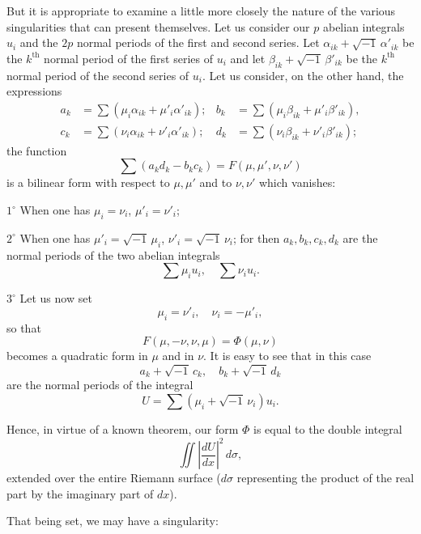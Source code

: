 \documentclass{article}
\begin{document}
But it is appropriate to examine a little more closely the nature of the various singularities that can present themselves. Let us consider our $p$ abelian integrals $u_{i}$ and the $2p$ normal periods of the first and second series. Let $\alpha_{ik} + \sqrt{-1}\,\alpha'_{ik}$ be the $k^{\text{th}}$ normal period of the first series of $u_{i}$ and let $\beta_{ik} + \sqrt{-1}\,\beta'_{ik}$ be the $k^{\text{th}}$ normal period of the
second series of $u_{i}$. Let us consider, on the other hand, the expressions
\[
\begin{aligned}
a_{k} &= \sum (\mu_{i} \alpha_{ik} + \mu'_{i} \alpha'_{ik}); & b_{k} &= \sum (\mu_{i} \beta_{ik} + \mu'_{i} \beta'_{ik}), \\
c_{k} &= \sum (\nu_{i} \alpha_{ik} + \nu'_{i} \alpha'_{ik}); & d_{k} &= \sum (\nu_{i} \beta_{ik} + \nu'_{i} \beta'_{ik});
\end{aligned}
\]
the function
\[
\sum (a_{k} d_{k} - b_{k} c_{k}) = F(\mu, \mu', \nu, \nu')
\]
is a bilinear form with respect to $\mu, \mu'$ and to $\nu, \nu'$ which vanishes:

$1^\circ$ When one has $\mu_{i} = \nu_{i}$, $\mu'_{i} = \nu'_{i}$;

$2^\circ$ When one has $\mu'_{i} = \sqrt{-1}\,\mu_{i}$, $\nu'_{i} = \sqrt{-1}\,\nu_{i}$; for then $a_{k}, b_{k}, c_{k}, d_{k}$ are the normal periods of the two abelian integrals
\[
\sum \mu_{i} u_{i}, \quad \sum \nu_{i} u_{i}.
\]

$3^\circ$ Let us now set
\[
\mu_{i} = \nu'_{i}, \quad \nu_{i} = -\mu'_{i},
\]
so that
\[
F(\mu, -\nu, \nu, \mu) = \Phi(\mu, \nu)
\]
becomes a quadratic form in $\mu$ and in $\nu$. It is easy to see that in this case
\[
a_{k} + \sqrt{-1}\,c_{k}, \quad b_{k} + \sqrt{-1}\,d_{k}
\]
are the normal periods of the integral
\[
U = \sum (\mu_{i} + \sqrt{-1}\,\nu_{i}) u_{i}.
\]

Hence, in virtue of a known theorem, our form $\Phi$ is equal to the double integral
\[
\iint \left| \frac{dU}{dx} \right|^{2} \,d\sigma, \tag{3}
\]
extended over the entire Riemann surface ($d\sigma$ representing the product of the real part by the imaginary part of $dx$).

That being set, we may have a singularity:
\end{document}
